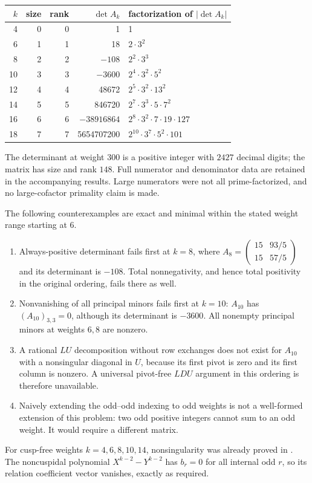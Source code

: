 \documentclass[12pt]{amsart}
\theoremstyle{definition}
\theoremstyle{remark}
\numberwithin{equation}{section}
\theoremstyle{definition}
\theoremstyle{remark}
\begin{document}
\begin{center}
\begin{tabular}{rrrrl}
\toprule
$k$&size&rank&$\det A_k$&factorization of $|\det A_k|$\\
\midrule
4&0&0&1&1\\
6&1&1&18&$2\cdot3^2$\\
8&2&2&$-108$&$2^2\cdot3^3$\\
10&3&3&$-3600$&$2^4\cdot3^2\cdot5^2$\\
12&4&4&48672&$2^5\cdot3^2\cdot13^2$\\
14&5&5&846720&$2^7\cdot3^3\cdot5\cdot7^2$\\
16&6&6&$-38916864$&$2^8\cdot3^2\cdot7\cdot19\cdot127$\\
18&7&7&5654707200&$2^{10}\cdot3^7\cdot5^2\cdot101$\\
\bottomrule
\end{tabular}
\end{center}
The determinant at weight $300$ is a positive integer with $2427$
decimal digits; the matrix has size and rank $148$. Full numerator and
denominator data are retained in the accompanying results. Large
numerators were not all prime-factorized, and no large-cofactor
primality claim is made.

The following counterexamples are exact and minimal within the stated
weight range starting at $6$.
\begin{enumerate}
\item Always-positive determinant fails first at $k=8$, where
$A_8=\left(\begin{smallmatrix}15&93/5\\15&57/5\end{smallmatrix}\right)$
and its determinant is $-108$. Total nonnegativity, and hence total
positivity in the original ordering, fails there as well.
\item Nonvanishing of all principal minors fails first at $k=10$:
$A_{10}$ has $(A_{10})_{3,3}=0$, although its determinant is $-3600$.
All nonempty principal minors at weights $6,8$ are nonzero.
\item A rational $LU$ decomposition without row exchanges does not exist
for $A_{10}$ with a nonsingular diagonal in $U$, because its first pivot
is zero and its first column is nonzero. A universal pivot-free $LDU$
argument in this ordering is therefore unavailable.
\item Naively extending the odd--odd indexing to odd weights is not a
well-formed extension of this problem: two odd positive integers cannot
sum to an odd weight. It would require a different matrix.
\end{enumerate}
For cusp-free weights $k=4,6,8,10,14$, nonsingularity was already
proved in \cite[Proposition 5.15]{BR}. The noncuspidal polynomial
$X^{k-2}-Y^{k-2}$ has $b_r=0$ for all internal odd $r$, so its relation
coefficient vector vanishes, exactly as required.
\end{document}
